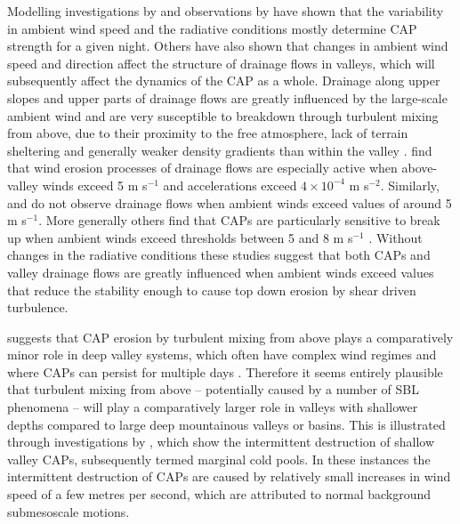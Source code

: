\documentclass[times]{qjrms4}
\begin{document}
Modelling investigations by \citet{vosper2008numerical} and observations by \citet{sheridan2013characteristics} have shown that the variability in ambient wind speed and the radiative conditions mostly determine CAP strength for a given night. Others have also shown that changes in ambient wind speed \citep{orgill1992mesoscale} and direction \citep{coulter1989} affect the structure of drainage flows in valleys, which will subsequently affect the dynamics of the CAP as a whole. Drainage along upper slopes and upper parts of drainage flows are greatly influenced by the large-scale ambient wind and are very susceptible to breakdown through turbulent mixing from above, due to their proximity to the free atmosphere, lack of terrain sheltering and generally weaker density gradients than within the valley \citep{barr1989influence,gudiksen1992measurements}. \citet{orgill1992mesoscale} find that wind erosion processes of drainage flows are especially active when above-valley winds exceed 5 m s$^{-1}$ and accelerations exceed $4\times10^{-4}$ m s$^{-2}$. Similarly, \citet{heywood1933katabatic} and \citet{gudiksen1992measurements} do not observe drainage flows when ambient winds exceed values of around 5 m s$^{-1}$. More generally others find that CAPs are particularly sensitive to break up when ambient winds exceed thresholds between 5 and 8 m s$^{-1}$ \citep{barr1989influence,iijima2000seasonal}. Without changes in the radiative conditions these studies suggest that both CAPs and valley drainage flows are greatly influenced when ambient winds exceed values that reduce the stability enough to cause top down erosion by shear driven turbulence. 

\citet{zangl2005dynamical} suggests that CAP erosion by turbulent mixing from above plays a comparatively minor role in deep valley systems, which often have complex wind regimes and where CAPs can persist for multiple days \citep{whiteman2001cold}. Therefore it seems entirely plausible that turbulent mixing from above -- potentially caused by a number of SBL phenomena -- will play a comparatively larger role in valleys with shallower depths compared to large deep mountainous valleys or basins. This is illustrated through investigations by \citet{mahrt2015common}, which show the intermittent destruction of shallow valley CAPs, subsequently termed marginal cold pools. In these instances the intermittent destruction of CAPs are caused by relatively small increases in wind speed of a few metres per second, which are attributed to normal background submesoscale motions.
\end{document}
